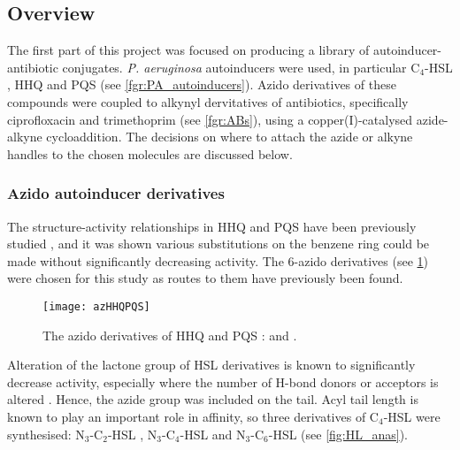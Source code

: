 \subsection{Overview}

The first part of this project was focused on producing a library of autoinducer-antibiotic conjugates. \textit{P. aeruginosa} autoinducers were used, in particular C$_4$-HSL , HHQ  and PQS  (see \ref{fgr:PA_autoinducers}). Azido derivatives of these compounds were coupled to alkynyl dervitatives of antibiotics, specifically ciprofloxacin  and trimethoprim  (see \ref{fgr:ABs}), using a copper(I)-catalysed azide-alkyne cycloaddition\cite{Tornoe2002,ANIE:ANIE2596}.
The decisions on where to attach the azide or alkyne handles to the chosen molecules are discussed below.

\subsubsection{Azido autoinducer derivatives}

The structure-activity relationships in HHQ  and PQS  have been previously studied \cite{Lu2012,Lu2014,Hodgkinson2010}, and it was shown various substitutions on the benzene ring could be made without significantly decreasing activity. The 6-azido derivatives (see \ref{fgr:azHHQPQS}) were chosen for this study as routes to them have previously been found\cite{Baker2015}.


\begin{figure}[H]
	\begin{center}
		\texttt{[image: azHHQPQS]}
		\caption{The azido derivatives of HHQ  and PQS :  and . \label{fgr:azHHQPQS}}
	\end{center}
\end{figure}

Alteration of the lactone group of HSL derivatives is known to significantly decrease activity, especially where the number of H-bond donors or acceptors is altered \cite{Galloway2011}. Hence, the azide group was included on the tail\cite{Stacy2013}. Acyl tail length is known to play an important role in affinity\cite{Galloway2011}, so three derivatives of C$_4$-HSL  were synthesised: N$_3$-C$_2$-HSL , N$_3$-C$_4$-HSL  and N$_3$-C$_6$-HSL  (see \ref{fig:HL_anas}).

